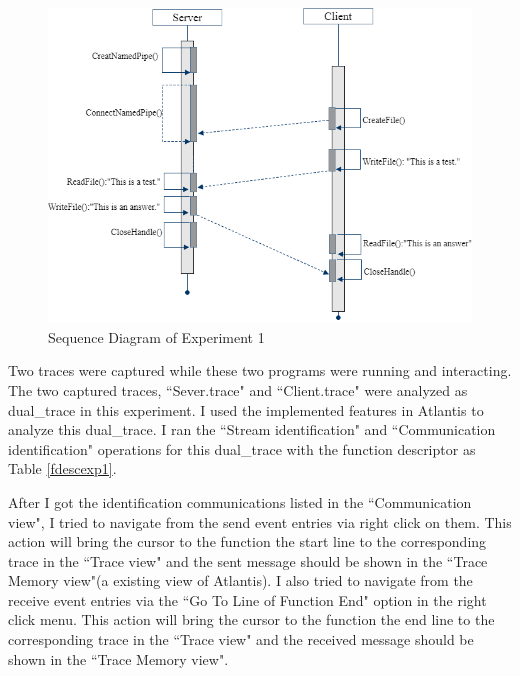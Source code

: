 \begin{figure}[H]
\centerline{\includegraphics[scale=0.6]{Figures/exp1}}
 \caption{Sequence Diagram of Experiment 1}
\label{exp1}
\end{figure}

Two traces were captured while these two programs were running and interacting. The two captured traces, ``Sever.trace" and ``Client.trace" were analyzed as dual\_trace in this experiment. I used the implemented features in Atlantis to analyze this dual\_trace. I ran the ``Stream identification" and ``Communication identification" operations for this dual\_trace with the function descriptor as Table \ref{fdescexp1}.

After I got the identification communications listed in the ``Communication view", I tried to navigate from the send event entries via right click on them. This action will bring the cursor to the function the start line to the corresponding trace in the ``Trace view" and the sent message should be shown in the ``Trace Memory view"(a existing view of Atlantis). I also tried to navigate from the receive event entries via the ``Go To Line of Function End" option in the right click menu. This action will bring the cursor to the function the end line to the corresponding trace in the ``Trace view" and the received message should be shown in the ``Trace Memory view".

